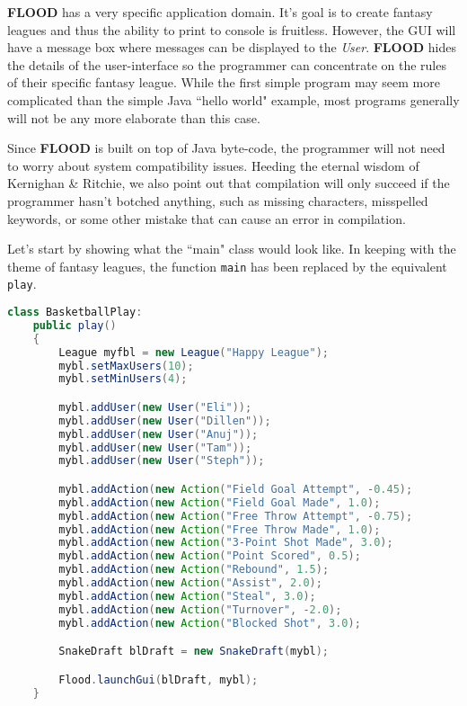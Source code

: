\documentclass[12pt]{report}
\begin{document}
\begin{doublespace}
\textbf{FLOOD} has a very specific application domain. It's goal is to create fantasy leagues and thus the ability to print to console is fruitless. However, the GUI will have a message box where messages can be displayed to the \textit{User}. \textbf{FLOOD} hides the details of the user-interface so the programmer can concentrate on the rules of their specific fantasy league. While the first simple program may seem more complicated than the simple Java ``hello world" example, most programs generally will not be any more elaborate than this case.

Since \textbf{FLOOD} is built on top of Java byte-code, the programmer will not need to worry about system compatibility issues. Heeding the eternal wisdom of Kernighan \& Ritchie, we also point out that compilation will only succeed if the programmer hasn't botched anything, such as missing characters, misspelled keywords, or some other mistake that can cause an error in compilation. 

Let's start by showing what the ``main" class would look like. In keeping with the theme of fantasy leagues, the function \texttt{main} has been replaced by the equivalent \texttt{play}. 
\end{doublespace}

\begin{lstlisting}[language=Java,label=some-code,caption=BasketballPlay.fld]
class BasketballPlay:
	public play()
	{
		League myfbl = new League("Happy League");
		mybl.setMaxUsers(10);
		mybl.setMinUsers(4);

		mybl.addUser(new User("Eli"));
		mybl.addUser(new User("Dillen"));
		mybl.addUser(new User("Anuj"));
		mybl.addUser(new User("Tam"));
		mybl.addUser(new User("Steph"));

		mybl.addAction(new Action("Field Goal Attempt", -0.45);
		mybl.addAction(new Action("Field Goal Made", 1.0);
		mybl.addAction(new Action("Free Throw Attempt", -0.75);
		mybl.addAction(new Action("Free Throw Made", 1.0);
		mybl.addAction(new Action("3-Point Shot Made", 3.0);
		mybl.addAction(new Action("Point Scored", 0.5);
		mybl.addAction(new Action("Rebound", 1.5);
		mybl.addAction(new Action("Assist", 2.0);
		mybl.addAction(new Action("Steal", 3.0);
		mybl.addAction(new Action("Turnover", -2.0);
		mybl.addAction(new Action("Blocked Shot", 3.0);

		SnakeDraft blDraft = new SnakeDraft(mybl);

		Flood.launchGui(blDraft, mybl);
	}
\end{lstlisting}
\end{document}
